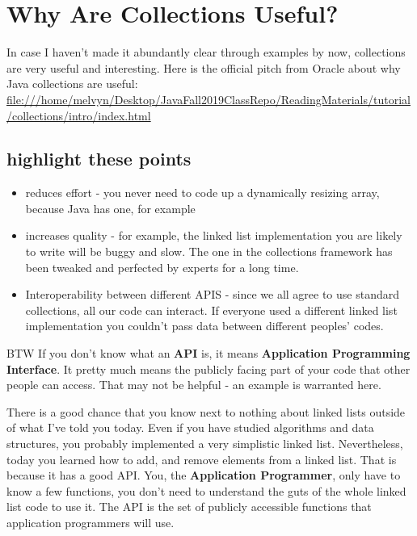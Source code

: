 \documentclass[12pt]{article}
\begin{document}
\section{Why Are Collections Useful?}
In case I haven't made it abundantly clear through examples by now, collections are very useful and interesting. Here is the official pitch from Oracle about why Java collections are useful:
\url{file:///home/melvyn/Desktop/JavaFall2019ClassRepo/ReadingMaterials/tutorial/collections/intro/index.html}

\subsection{highlight these points}
\begin{itemize}
\item reduces effort - you never need to code up a dynamically resizing array, because Java has one, for example
\item increases quality - for example, the linked list implementation you are likely to write will be buggy and slow. The one in the collections framework has been tweaked and perfected by experts for a long time.
\item Interoperability between different APIS - since we all agree to use standard collections, all our code can interact. If everyone used a different linked list implementation you couldn't pass data between different peoples' codes.
\end{itemize}

BTW If you don't know what an \textbf{API} is, it means \textbf{Application Programming Interface}. It pretty much means the publicly facing part of your code that other people can access. That may not be helpful - an example is warranted here.

There is a good chance that you know next to nothing about linked lists outside of what I've told you today. Even if you have studied algorithms and data structures, you probably implemented a very simplistic linked list. Nevertheless, today you learned how to add, and remove elements from a linked list. That is because it has a good API. You, the \textbf{Application Programmer}, only have to know a few functions, you don't need to understand the guts of the whole linked list code to use it. The API is the set of publicly accessible functions that application programmers will use.
\end{document}
